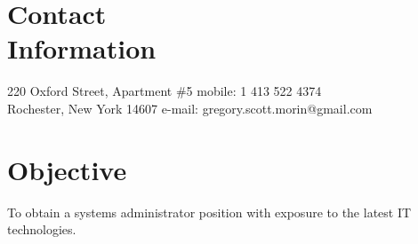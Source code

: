\documentclass[margin,line]{resume}
\begin{document}
\begin{resume}

    \section{\mysidestyle Contact\\Information}

    220 Oxford Street, Apartment \#5    \hfill mobile: 1 413 522 4374   \vspace{0mm}\\\vspace{0mm}%
    Rochester, New York 14607          \hfill e-mail: gregory.scott.morin@gmail.com  \vspace{0mm}\\\vspace{-4.5mm}%

    \section{\mysidestyle Objective} 
    To obtain a systems administrator position with exposure to the latest IT technologies. 




\end{resume}
\end{document}
